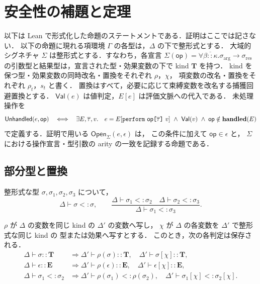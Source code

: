 \section{安全性の補題と定理}
\label{sec:systemfxi-safety}

以下は Lean で形式化した命題のステートメントである．証明はここでは記さない．
以下の命題に現れる項環境 $\Gamma$ の各型は，$\Delta$ の下で整形式とする．
大域的シグネチャ $\Sigma$ は整形式とする．すなわち，各宣言
$\Sigma(\mathsf{op})=
 \forall\overline{\beta::\kappa}.
 \sigma_{\mathrm{arg}}\to\sigma_{\mathrm{res}}$
の引数型と結果型は，宣言された型・効果変数の下で kind $\mathbf{T}$ を持つ．
kind を保つ型・効果変数の同時改名・置換をそれぞれ $\rho$，$\chi$，
項変数の改名・置換をそれぞれ $\rho_t$，$s_t$ と書く．
置換はすべて，必要に応じて束縛変数を改名する捕獲回避置換とする．
$\mathsf{Val}(e)$ は値判定，$E[e]$ は評価文脈への代入である．
未処理操作を
\[
  \mathsf{Unhandled}(e,\mathsf{op})
  \quad\Longleftrightarrow\quad
  \exists E,\overline{\tau},v.\quad
    e=E[\texttt{perform}~\mathsf{op}
      \texttt{[} \overline{\tau} \texttt{]}~v]
    \ \land\ \mathsf{Val}(v)
    \ \land\;
    \mathsf{op}\notin\mathbf{handled}(E)
\]
で定義する．証明で用いる $\mathsf{Open}_{\Sigma}(e,\epsilon)$ は，
この条件に加えて $\mathsf{op}\in\epsilon$ と，
$\Sigma$ における操作宣言・型引数の arity の一致を記録する命題である．

\subsection{部分型と置換}

\begin{lemma}[部分型の反射律と推移律]
\label{lem:fxi-subtyping}
整形式な型 $\sigma,\sigma_1,\sigma_2,\sigma_3$ について，
\[
  \Delta\vdash\sigma<:\sigma,
  \qquad
  \frac{\Delta\vdash\sigma_1<:\sigma_2
        \quad\Delta\vdash\sigma_2<:\sigma_3}
       {\Delta\vdash\sigma_1<:\sigma_3}.
\]
\end{lemma}

\begin{lemma}[型・効果変数の改名と置換]
\label{lem:fxi-type-structural}
$\rho$ が $\Delta$ の変数を同じ kind の $\Delta'$ の変数へ写し，
$\chi$ が $\Delta$ の各変数を $\Delta'$ で整形式な同じ kind の
型または効果へ写すとする．
このとき，次の各判定は保存される．
\begin{align*}
  \Delta\vdash\sigma::\mathbf{T}
    &\Longrightarrow
      \Delta'\vdash\rho(\sigma)::\mathbf{T},
      \quad
      \Delta'\vdash\sigma[\chi]::\mathbf{T},\\
  \Delta\vdash\epsilon::\mathbf{E}
    &\Longrightarrow
      \Delta'\vdash\rho(\epsilon)::\mathbf{E},
      \quad
      \Delta'\vdash\epsilon[\chi]::\mathbf{E},\\
  \Delta\vdash\sigma_1<:\sigma_2
    &\Longrightarrow
      \Delta'\vdash\rho(\sigma_1)<:\rho(\sigma_2),
      \quad
      \Delta'\vdash\sigma_1[\chi]<:\sigma_2[\chi].
\end{align*}
\end{lemma}

